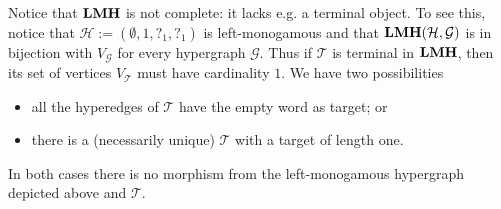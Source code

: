 \documentclass[3p]{elsarticle}
\newcommand{\catname}[1]{\textbf{\textup{#1}}}
\newcommand{\lmo}{\catname{LMH}}
\theoremstyle{remark}
\theoremstyle{definition}
\begin{document}
\begin{rem}\label{rem:con}Notice that  $\lmo$ is not complete: it lacks e.g. a terminal object. To see this, notice that $\mathcal{H}:=(\emptyset, 1, ?_{1}, ?_{1} )$ is left-monogamous and that 
	$\lmo(\mathcal{H}, \mathcal{G})$ is in bijection with $V_{\mathcal{G}}$ for every hypergraph $\mathcal{G}$. Thus if  $\mathcal{T}$ is terminal in $\lmo$, then its set of vertices $V_{\mathcal{T}}$ must have cardinality $1$.  We have two possibilities	

\vspace{.1cm}
	\begin{minipage}[l]{.65\linewidth}
		\begin{itemize}
			\item  all the hyperedges of $\mathcal{T}$ have the empty word as target; or
			\item there is a (necessarily unique) $\mathcal{T}$ with a target of length one.
		\end{itemize}
	\end{minipage}
	\begin{minipage}[r]{.15\linewidth}
	\end{minipage}
	
\vspace{.1cm}
\noindent
In both cases there is no morphism from the left-monogamous hypergraph depicted above and $\mathcal{T}$. 
\end{rem}
\end{document}
